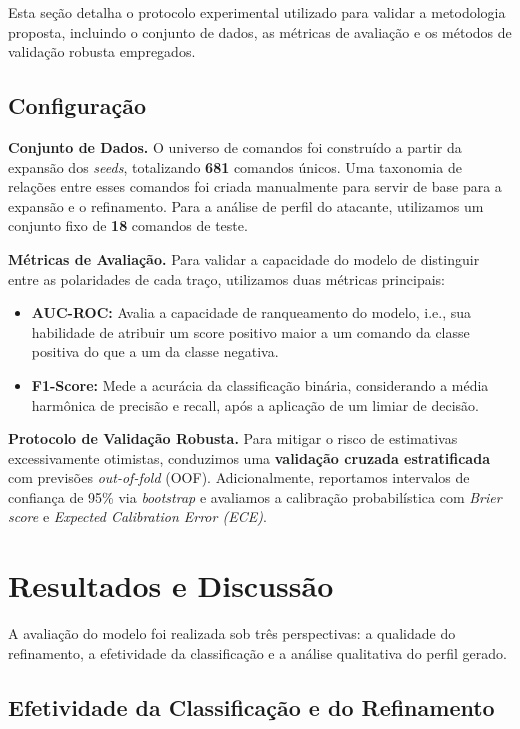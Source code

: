 \documentclass[12pt]{article}
\begin{document}
Esta seção detalha o protocolo experimental utilizado para validar a metodologia proposta, incluindo o conjunto de dados, as métricas de avaliação e os métodos de validação robusta empregados.

\subsection{Configuração}

\textbf{Conjunto de Dados.} O universo de comandos foi construído a partir da expansão dos \textit{seeds}, totalizando \textbf{681} comandos únicos. Uma taxonomia de relações entre esses comandos foi criada manualmente para servir de base para a expansão e o refinamento. Para a análise de perfil do atacante, utilizamos um conjunto fixo de \textbf{18} comandos de teste.

\textbf{Métricas de Avaliação.} Para validar a capacidade do modelo de distinguir entre as polaridades de cada traço, utilizamos duas métricas principais:
\begin{itemize}
    \item \textbf{AUC-ROC:} Avalia a capacidade de ranqueamento do modelo, i.e., sua habilidade de atribuir um score positivo maior a um comando da classe positiva do que a um da classe negativa.
    \item \textbf{F1-Score:} Mede a acurácia da classificação binária, considerando a média harmônica de precisão e recall, após a aplicação de um limiar de decisão.
\end{itemize}

\textbf{Protocolo de Validação Robusta.} Para mitigar o risco de estimativas excessivamente otimistas, conduzimos uma \textbf{validação cruzada estratificada} com previsões \textit{out-of-fold} (OOF). Adicionalmente, reportamos intervalos de confiança de 95\% via \textit{bootstrap} e avaliamos a calibração probabilística com \textit{Brier score} e \textit{Expected Calibration Error (ECE)}.

\section{Resultados e Discussão}
\label{sec:resultados}

A avaliação do modelo foi realizada sob três perspectivas: a qualidade do refinamento, a efetividade da classificação e a análise qualitativa do perfil gerado.

\subsection{Efetividade da Classificação e do Refinamento}
\end{document}

